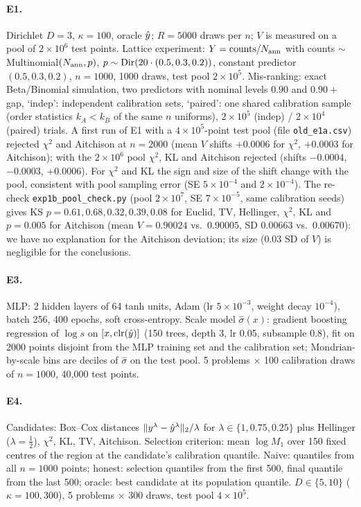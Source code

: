 \paragraph{E1.} Dirichlet $D=3$, $\kappa=100$, oracle $\hat y$; $R=5000$ draws per $n$; $V$ is measured on a pool of $2\times10^6$ test points. Lattice experiment: $Y=\text{counts}/N_{\rm ann}$ with counts $\sim$ Multinomial$(N_{\rm ann},p)$, $p\sim\mathrm{Dir}(20\cdot(0.5,0.3,0.2))$, constant predictor $(0.5,0.3,0.2)$, $n=1000$, 1000 draws, test pool $2\times10^5$. Mis-ranking: exact Beta/Binomial simulation, two predictors with nominal levels $0.90$ and $0.90+$gap, `indep': independent calibration sets, `paired': one shared calibration sample (order statistics $k_A<k_B$ of the same $n$ uniforms), $2\times10^5$ (indep) / $2\times10^4$ (paired) trials. A first run of E1 with a $4\times10^5$-point test pool (file \texttt{old\_e1a.csv}) rejected $\chi^2$ and Aitchison at $n=2000$ (mean $V$ shifts $+0.0006$ for $\chi^2$, $+0.0003$ for Aitchison); with the $2\times10^6$ pool $\chi^2$, KL and Aitchison rejected (shifts $-0.0004$, $-0.0003$, $+0.0006$). For $\chi^2$ and KL the sign and size of the shift change with the pool, consistent with pool sampling error (SE $5\times10^{-4}$ and $2\times10^{-4}$). The re-check \texttt{exp1b\_pool\_check.py} (pool $2\times10^7$, SE $7\times10^{-5}$, same calibration seeds) gives KS $p=0.61,0.68,0.32,0.39,0.08$ for Euclid, TV, Hellinger, $\chi^2$, KL and $p=0.005$ for Aitchison (mean $V=0.90024$ vs.\ $0.90005$, SD $0.00663$ vs.\ $0.00670$): we have no explanation for the Aitchison deviation; its size ($0.03$ SD of $V$) is negligible for the conclusions.
\paragraph{E3.} MLP: 2 hidden layers of 64 tanh units, Adam (lr $5\times10^{-3}$, weight decay $10^{-4}$), batch 256, 400 epochs, soft cross-entropy. Scale model $\hat\sigma(x)$: gradient boosting regression of $\log s$ on $[x,\mathrm{clr}(\hat y)]$ (150 trees, depth 3, lr 0.05, subsample 0.8), fit on 2000 points disjoint from the MLP training set and the calibration set; Mondrian-by-scale bins are deciles of $\hat\sigma$ on the test pool. 5 problems $\times$ 100 calibration draws of $n=1000$, 40{,}000 test points.
\paragraph{E4.} Candidates: Box--Cox distances $\|y^\lambda-\hat y^\lambda\|_2/\lambda$ for $\lambda\in\{1,0.75,0.25\}$ plus Hellinger ($\lambda=\tfrac12$), $\chi^2$, KL, TV, Aitchison. Selection criterion: mean $\log M_1$ over 150 fixed centres of the region at the candidate's calibration quantile. Naive: quantiles from all $n=1000$ points; honest: selection quantiles from the first 500, final quantile from the last 500; oracle: best candidate at its population quantile. $D\in\{5,10\}$ ($\kappa=100,300$), 5 problems $\times$ 300 draws, test pool $4\times10^5$.
